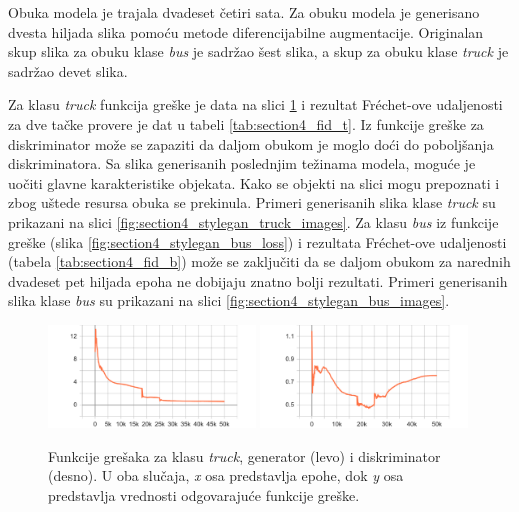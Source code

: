 \documentclass[12pt,oneside]{memoir}
\begin{document}
Obuka modela je trajala dvadeset četiri sata. Za obuku modela je generisano dvesta hiljada slika pomoću metode diferencijabilne augmentacije. Originalan skup slika za obuku klase \textit{bus} je sadržao šest slika, a skup za obuku klase \textit{truck} je sadržao devet slika.

Za klasu \textit{truck} funkcija greške je data na slici \ref{fig:section4_stylegan_truck_loss} i rezultat Fréchet-ove udaljenosti za dve tačke provere je dat u tabeli \ref{tab:section4_fid_t}. Iz funkcije greške za diskriminator može se zapaziti da daljom obukom je moglo doći do poboljšanja diskriminatora. Sa slika generisanih poslednjim težinama modela, moguće je uočiti glavne karakteristike objekata. Kako se objekti na slici mogu prepoznati i zbog uštede resursa obuka se prekinula. Primeri generisanih slika klase \textit{truck} su prikazani na slici \ref{fig:section4_stylegan_truck_images}.
Za klasu \textit{bus} iz funkcije greške (slika \ref{fig:section4_stylegan_bus_loss}) i rezultata Fréchet-ove udaljenosti (tabela \ref{tab:section4_fid_b}) može se zaključiti da se daljom obukom za narednih dvadeset pet hiljada epoha ne dobijaju znatno bolji rezultati. Primeri generisanih slika klase \textit{bus} su prikazani na slici \ref{fig:section4_stylegan_bus_images}.


\begin{figure}[!htbp]
\centering
  \includegraphics[width=0.49\textwidth]{matfmaster/stylegan/truck/g_loss.png}
  \includegraphics[width=0.49\textwidth]{matfmaster/stylegan/truck/d_loss.png}
\caption{Funkcije grešaka za klasu \textit{truck}, generator (levo) i diskriminator (desno). U oba slučaja, \textit{x} osa predstavlja epohe, dok \textit{y} osa predstavlja vrednosti odgovarajuće funkcije greške.}\label{fig:section4_stylegan_truck_loss}
\end{figure}
\end{document}
